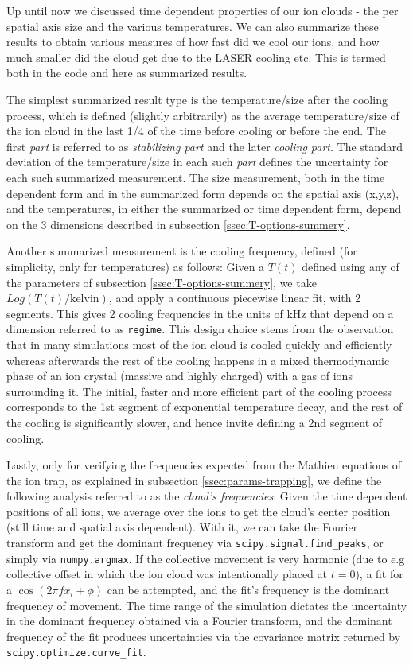 Up until now we discussed time dependent properties of our ion clouds - the per spatial axis size and the various temperatures. We can also summarize these results to obtain various measures of how fast did we cool our ions, and how much smaller did the cloud get due to the LASER cooling etc. This is termed both in the code and here as summarized results.

The simplest summarized result type is the temperature/size after the cooling process, which is defined (slightly arbitrarily) as the average temperature/size of the ion cloud in the last 1/4 of the time before cooling or before the end. The first \textit{part} is referred to as \textit{stabilizing part} and the later \textit{cooling part}. The standard deviation of the temperature/size in each such \textit{part} defines the uncertainty for each such summarized measurement. The size measurement, both in the time dependent form and in the summarized form depends on the spatial axis (x,y,z), and the temperatures, in either the summarized or time dependent form, depend on the 3 dimensions described in subsection \ref{ssec:T-options-summery}.

Another summarized measurement is the cooling frequency, defined (for simplicity, only for temperatures) as follows: Given a $T(t)$ defined using any of the parameters of subsection \ref{ssec:T-options-summery}, we take $Log(T(t)/\mathrm{kelvin})$, and apply a continuous piecewise linear fit\cite{pwlf}, with 2 segments. This gives 2 cooling frequencies in the units of $\mathrm{kHz}$ that depend on a dimension referred to as \texttt{regime}. This design choice stems from the observation that in many simulations most of the ion cloud is cooled quickly and efficiently whereas afterwards the rest of the cooling happens in a mixed thermodynamic phase of an ion crystal (massive and highly charged) with a gas of ions surrounding it. The initial, faster and more efficient part of the cooling process corresponds to the 1st segment of exponential temperature decay, and the rest of the cooling is significantly slower, and hence invite defining a 2nd segment of cooling.

Lastly, only for verifying the frequencies expected from the Mathieu equations of the ion trap, as explained in subsection \ref{ssec:params-trapping}, we define the following analysis referred to as the \textit{cloud's frequencies}: Given the time dependent positions of all ions, we average over the ions to get the cloud's center position (still time and spatial axis dependent). With it, we can take the Fourier transform and get the dominant frequency via \texttt{scipy.signal.find\_peaks}\cite{scipy}, or simply via \texttt{numpy.argmax}\cite{numpy}. If the collective movement is very harmonic (due to e.g collective offset in which the ion cloud was intentionally placed at $t=0$), a fit for a $\cos(2\pi f x_i + \phi)$ can be attempted, and the fit's frequency is the dominant frequency of movement. The time range of the simulation dictates the uncertainty in the dominant frequency obtained via a Fourier transform, and the dominant frequency of the fit produces uncertainties via the covariance matrix returned by \texttt{scipy.optimize.curve\_fit}.
